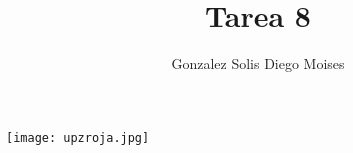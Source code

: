 \documentclass[12pt,a4paper]{article}
\author{Gonzalez Solis Diego Moises}
\title{Tarea 8}
\begin{document}
\maketitle
\texttt{[image: upzroja.jpg]} 
\newpage

\end{document}
